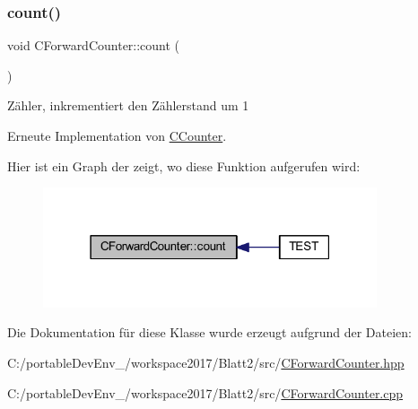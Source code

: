 \subsubsection{\texorpdfstring{count()}{count()}}
{\footnotesize\ttfamily void C\+Forward\+Counter\+::count (\begin{DoxyParamCaption}{ }\end{DoxyParamCaption})\hspace{0.3cm}{\ttfamily [virtual]}}

Zähler, inkrementiert den Zählerstand um 1 

Erneute Implementation von \hyperlink{class_c_counter_a90f3e164f3fc1dcf91044702d6940c4d}{C\+Counter}.

Hier ist ein Graph der zeigt, wo diese Funktion aufgerufen wird\+:
\nopagebreak
\begin{figure}[H]
\begin{center}
\leavevmode
\includegraphics[width=279pt]{class_c_forward_counter_afc451afa9f8b76f70b28c08982265a86_icgraph}
\end{center}
\end{figure}


Die Dokumentation für diese Klasse wurde erzeugt aufgrund der Dateien\+:\begin{DoxyCompactItemize}
\item 
C\+:/portable\+Dev\+Env\+\_/workspace2017/\+Blatt2/src/\hyperlink{_c_forward_counter_8hpp}{C\+Forward\+Counter.\+hpp}\item 
C\+:/portable\+Dev\+Env\+\_/workspace2017/\+Blatt2/src/\hyperlink{_c_forward_counter_8cpp}{C\+Forward\+Counter.\+cpp}\end{DoxyCompactItemize}
